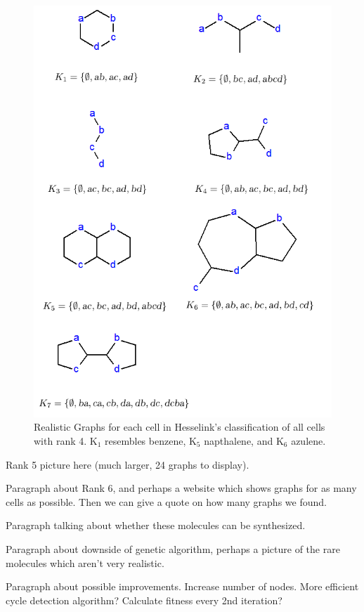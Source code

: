 \documentclass[12pt]{article}
\begin{document}
\begin{figure}[ht!]
\centering
\includegraphics[width=130mm]{rank4Results.png}
\caption{Realistic Graphs for each cell in Hesselink's classification of all cells with rank 4. K$_1$ resembles benzene, K$_5$ napthalene, and K$_6$ azulene.}
\end{figure}

Rank 5 picture here (much larger, 24 graphs to display).

Paragraph about Rank 6, and perhaps a website which shows graphs for as many cells as possible. Then we can give a quote on how many graphs we found.

Paragraph talking about whether these molecules can be synthesized.

Paragraph about downside of genetic algorithm, perhaps a picture of the rare molecules which aren't very realistic.

Paragraph about possible improvements. Increase number of nodes. More efficient cycle detection algorithm? Calculate fitness every 2nd iteration?
\end{document}
